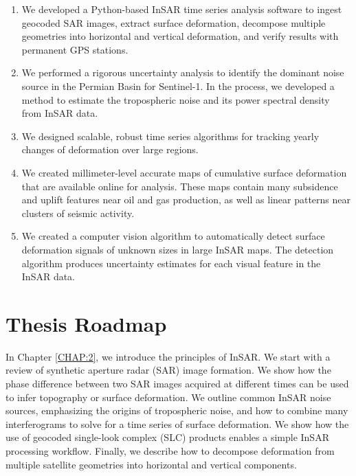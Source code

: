 \begin{enumerate}
	
	\item We developed a Python-based InSAR time series analysis software to ingest geocoded SAR images, extract surface deformation, decompose multiple geometries into horizontal and vertical deformation, and verify results with permanent GPS stations.
	
	\item We performed a rigorous uncertainty analysis to identify the dominant noise source in the Permian Basin for Sentinel-1.  In the process, we developed a method to estimate the tropospheric noise and its power spectral density from InSAR data.
	
	\item We designed scalable, robust time series algorithms for tracking yearly changes of deformation over large regions.
	
	\item We created millimeter-level accurate maps of cumulative surface deformation that are available online for analysis. These maps contain many subsidence and uplift features near oil and gas production, as well as linear patterns near clusters of seismic activity.
	
	\item We created a computer vision algorithm to automatically detect surface deformation signals of unknown sizes in large InSAR maps. The detection algorithm produces uncertainty estimates for each visual feature in the InSAR data.
	
	
	
\end{enumerate}


\section{Thesis Roadmap}
\label{sec:chap1-roadmap}


In Chapter \ref{CHAP:2}, we introduce the principles of InSAR. We start with a review of synthetic aperture radar (SAR) image formation. We show how the phase difference between two SAR images acquired at different times can be used to infer topography or surface deformation. We outline common InSAR noise sources, emphasizing the origins of tropospheric noise, and how to combine many interferograms to solve for a time series of surface deformation. We show how the use of geocoded single-look complex (SLC) products enables a simple InSAR processing workflow. Finally, we describe how to decompose deformation from multiple satellite geometries into horizontal and vertical components.


